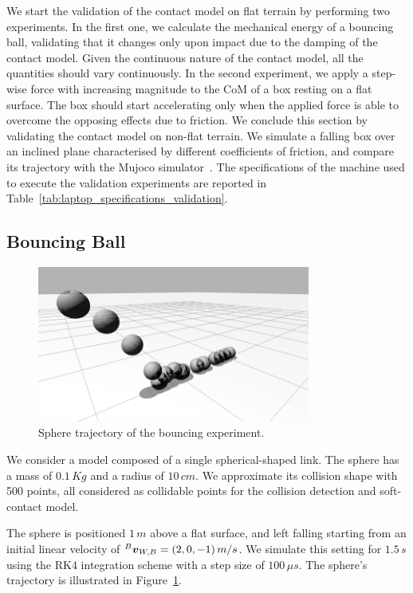 We start the validation of the contact model on flat terrain by performing two experiments.
In the first one, we calculate the mechanical energy of a bouncing ball, validating that it changes only upon impact due to the damping of the contact model.
Given the continuous nature of the contact model, all the quantities should vary continuously.
In the second experiment, we apply a step-wise force with increasing magnitude to the \ac{CoM} of a box resting on a flat surface.
The box should start accelerating only when the applied force is able to overcome the opposing effects due to friction.
We conclude this section by validating the contact model on non-flat terrain.
We simulate a falling box over an inclined plane characterised by different coefficients of friction, and compare its trajectory with the Mujoco simulator~\parencite{todorov_mujoco_2012}.
The specifications of the machine used to execute the validation experiments are reported in Table~\ref{tab:laptop_specifications_validation}.

\subsection{Bouncing Ball}

\begin{figure}
    \centering
    \includegraphics[width=0.8\textwidth]{images/contributions/chapter_7/bouncing_ball_trajectory.png}
    \caption{Sphere trajectory of the bouncing experiment.}
    \label{fig:bouncing_ball_trajectory}
\end{figure}

We consider a model composed of a single spherical-shaped link.
The sphere has a mass of $0.1 \, Kg$ and a radius of $10 \, cm$.
We approximate its collision shape with 500 points, all considered as collidable points for the collision detection and soft-contact model.

The sphere is positioned $1 \, m$ above a flat surface, and left falling starting from an initial linear velocity of $\vellin[B]_{W,B} = (2, 0, -1) \, m/s$.
We simulate this setting for $1.5 \, s$ using the \ac{RK4} integration scheme with a step size of $100 \, \mu s$.
The sphere's trajectory is illustrated in Figure~\ref{fig:bouncing_ball_trajectory}.

